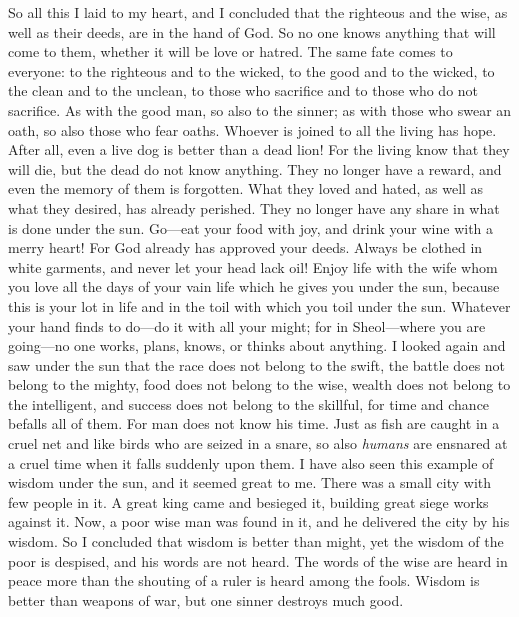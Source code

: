 \begin{biblechapter} %
 So all this I laid to my heart, and I concluded that the righteous and the wise, as well as their deeds, are in the hand of God. So no one knows anything that will come to them, whether it will be love or hatred.
\verse The same fate comes to everyone:
\verse to the righteous and to the wicked, 
to the good and to the wicked, 
to the clean and to the unclean, 
to those who sacrifice and to those who do not sacrifice. 
As with the good man, so also to the sinner; 
as with those who swear an oath, so also those who fear oaths.
 Whoever is joined to all the living has hope. After all, even a live dog is better than a dead lion!
\verse For the living know that they will die, but the dead do not know anything. They no longer have a reward, and even the memory of them is forgotten.
\verse What they loved and hated, as well as what they desired, has already perished. They no longer have any share in what is done under the sun.
 Go—eat your food with joy, and drink your wine with a merry heart! For God already has approved your deeds.
\verse Always be clothed in white garments, and never let your head lack oil!
\verse Enjoy life with the wife whom you love all the days of your vain life which he gives you under the sun, because this is your lot in life and in the toil with which you toil under the sun.
\verse Whatever your hand finds to do—do it with all your might; for in Sheol—where you are going—no one works, plans, knows, or thinks about anything.
 I looked again and saw under the sun that the race does not belong to the swift, the battle does not belong to the mighty, food does not belong to the wise, wealth does not belong to the intelligent, and success does not belong to the skillful, for time and chance befalls all of them.
\verse For man does not know his time. Just as fish are caught in a cruel net and like birds who are seized in a snare, so also \textit{humans} are ensnared at a cruel time when it falls suddenly upon them.
 I have also seen this example of wisdom under the sun, and it seemed great to me.
\verse There was a small city with few people in it. A great king came and besieged it, building great siege works against it.
\verse Now, a poor wise man was found in it, and he delivered the city by his wisdom.
\verse So I concluded that wisdom is better than might, yet the wisdom of the poor is despised, and his words are not heard.
 The words of the wise are heard in peace 
more than the shouting of a ruler is heard among the fools.
\verse Wisdom is better than weapons of war, 
but one sinner destroys much good.
\end{biblechapter}

